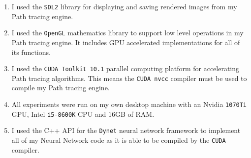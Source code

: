 \documentclass[ %
                    author={Callum Pearce},
                supervisor={Dr. Neill Campbell},
                    degree={MEng},
                     title={How effective are Temporal difference learning methods for reducing the number of zero contribution light paths, while still accurately approximating Global Illumination in Path tracing?},
                  subtitle={},
                      type={research},
                      year={2019} ]{dissertation}
\begin{document}

\begin{enumerate}
\item I used the \verb|SDL2|  library for displaying and saving rendered 
images from my Path tracing engine.

\item I used the \verb|OpenGL| mathematics library to support low level 
operations in my Path tracing engine. It includes GPU accelerated 
 implementations for all of its functions.
 
\item I used the \verb|CUDA Toolkit 10.1| parallel computing platform for
 accelerating Path tracing algorithms. This means the \verb|CUDA nvcc|
 compiler must be used to compile my Path tracing engine.

\item All experiments were run on my own desktop machine with an
Nvidia \verb|1070Ti| GPU, Intel \verb|i5-8600K| CPU and $16$GB of RAM.

\item I used the C++ API for the \verb|Dynet| neural network framework 
to implement all of my Neural Network code as it is able to be compiled
by the \verb|CUDA| compiler.
\end{enumerate}
\end{document}

